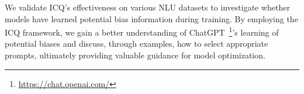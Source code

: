 We validate ICQ's effectiveness on various NLU datasets 
to investigate whether models have learned potential bias 
information during training. 
By employing the ICQ framework, 
we gain a better understanding of ChatGPT~\footnote{\url{https://chat.openai.com/}}'s 
learning of potential biases and discuss, 
through examples, how to select appropriate prompts, 
ultimately providing 
valuable guidance for model optimization.


%
%

